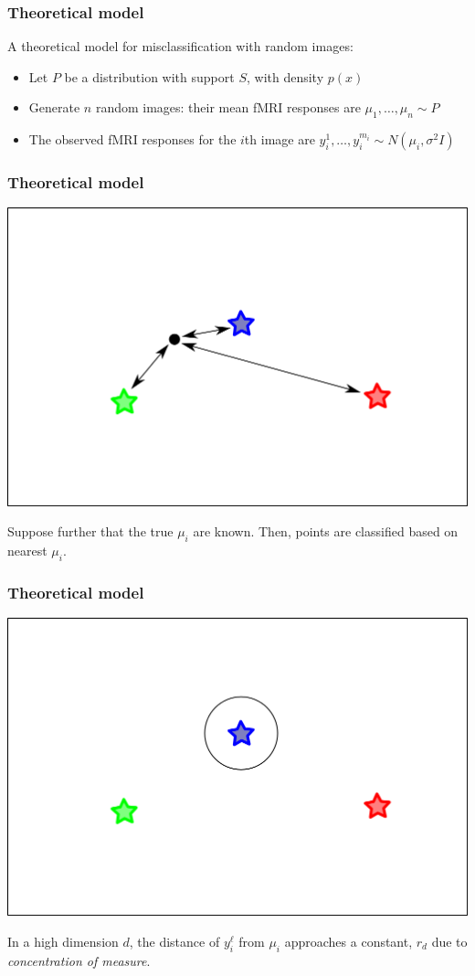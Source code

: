 \documentclass{beamer}
\begin{document}
\begin{frame}
\frametitle{Theoretical model}
A theoretical model for misclassification with random images:
\begin{itemize}
\item Let $P$ be a distribution with support $S$, with density $p(x)$
\item Generate $n$ random images: their mean fMRI responses are
  $\mu_1, \hdots, \mu_n \sim P$
\item The observed fMRI responses for the $i$th image are $y_i^1,\hdots, y_i^{m_i} \sim N(\mu_i, \sigma^2 I)$
\end{itemize}
\end{frame}

\begin{frame}
\frametitle{Theoretical model}
\begin{center}
\includegraphics[scale=0.5]{fig02.png}
\end{center}

Suppose further that the true $\mu_i$ are known.
Then, points are classified based on nearest $\mu_i$.
\end{frame}

\begin{frame}
\frametitle{Theoretical model}
\begin{center}
\includegraphics[scale=0.5]{fig03.png}
\end{center}

In a high dimension $d$, the distance of $y_i^\ell$ from $\mu_i$ approaches a
constant, $r_d$ due to \emph{concentration of measure}.
\end{frame}
\end{document}
